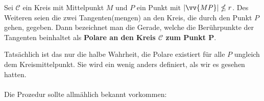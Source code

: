             \begin{Definition}
                \paragraph{} Sei $\mathscr{C}$ ein Kreis mit Mittelpunkt $M$ und $P$ ein Punkt mit $|\vv{MP}| \nleq r$. Des Weiteren seien die zwei Tangenten(mengen) an den Kreis, die durch den Punkt $P$ gehen, gegeben. Dann bezeichnet man die Gerade, welche die Berührpunkte der Tangenten beinhaltet als \textbf{Polare an den Kreis $\mathscr{C}$ zum Punkt P}.
            \end{Definition}

            \begin{Bemerkung}
                Tatsächlich ist das nur die halbe Wahrheit, die Polare existiert für alle $P$ ungleich dem Kreismittelpunkt. Sie wird ein wenig anders definiert, als wir es gesehen hatten.
            \end{Bemerkung}

            \paragraph{} Die Prozedur sollte allmählich bekannt vorkommen:

